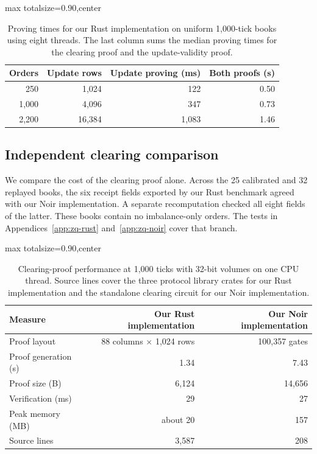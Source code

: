 \begin{table}[!tp]
\centering
\caption{Proving times for our Rust implementation on uniform 1,000-tick
books using eight threads. The last column sums the median proving times
for the clearing proof and the update-validity proof.}
\label{tab:rust-proving-by-order-count}
\setlength{\tabcolsep}{3pt}
\begin{adjustbox}{max totalsize={\linewidth}{0.90\textheight},center}
\begin{tabular}{@{}rrrr@{}}
\toprule
Orders & Update rows & Update proving (ms) & Both proofs (s) \\
\midrule
  250 &  1,024 &   122 & 0.50 \\
1,000 &  4,096 &   347 & 0.73 \\
2,200 & 16,384 & 1,083 & 1.46 \\
\bottomrule
\end{tabular}
\end{adjustbox}
\end{table}

\subsection{Independent clearing comparison}
\label{sec:zq-comparison}

We compare the cost of the clearing proof alone. Across the 25 calibrated and 32 replayed books, the six receipt fields exported by our Rust benchmark agreed with our Noir implementation. A separate recomputation checked all eight fields of the latter. These books contain no imbalance-only orders. The tests in Appendices~\ref{app:zq-rust} and~\ref{app:zq-noir} cover that branch.

\begin{table}[!tp]
\centering
\caption{Clearing-proof performance at 1,000 ticks with 32-bit volumes
on one CPU thread. Source lines cover the three protocol library crates
for our Rust implementation and the standalone clearing circuit for our
Noir implementation.}
\label{tab:rust-noir-clearing}
\setlength{\tabcolsep}{3pt}
\begin{adjustbox}{max totalsize={\linewidth}{0.90\textheight},center}
\begin{tabular}{@{}lrr@{}}
\toprule
Measure & Our Rust implementation & Our Noir implementation \\
\midrule
Proof layout         & 88 columns \(\times\) 1,024 rows & 100,357 gates \\
Proof generation (s) & 1.34     & 7.43   \\
Proof size (B)       & 6,124    & 14,656 \\
Verification (ms)    & 29       & 27     \\
Peak memory (MB)     & about 20 & 157    \\
Source lines         & 3,587    & 208    \\
\bottomrule
\end{tabular}
\end{adjustbox}
\end{table}

